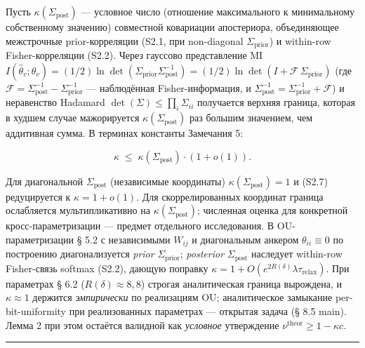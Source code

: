 \documentclass[pdflatex,sn-mathphys-ay]{sn-jnl}
\begin{document}
Пусть \(\kappa(\Sigma_{\text{post}})\) --- условное число (отношение максимального к минимальному собственному значению) совместной ковариации апостериора, объединяющее межстрочные prior-корреляции (S2.1, при non-diagonal \(\Sigma_{\text{prior}}\)) и within-row Fisher-корреляции (S2.2). Через гауссово представление MI \(I(\hat\theta_v; \theta_v) = (1/2) \ln \det(\Sigma_{\text{prior}} \Sigma_{\text{post}}^{-1}) = (1/2) \ln \det(I + \mathcal{F}\,\Sigma_{\text{prior}})\) (где \(\mathcal{F} = \Sigma_{\text{post}}^{-1} - \Sigma_{\text{prior}}^{-1}\) --- наблюдённая Fisher-информация, и \(\Sigma_{\text{post}}^{-1} = \Sigma_{\text{prior}}^{-1} + \mathcal{F}\)) и неравенство Hadamard \(\det(\Sigma) \le \prod_i \Sigma_{ii}\) получается верхняя граница, которая в худшем случае мажорируется \(\kappa(\Sigma_{\text{post}})\) раз большим значением, чем аддитивная сумма. В терминах константы Замечания 5:



\begin{equation}\kappa \;\le\; \kappa(\Sigma_{\text{post}}) \cdot (1 + o(1)). \tag{S2.7}\end{equation}



Для диагональной \(\Sigma_{\text{post}}\) (независимые координаты) \(\kappa(\Sigma_{\text{post}}) = 1\) и (S2.7) редуцируется к \(\kappa = 1 + o(1)\). Для скоррелированных координат граница ослабляется мультипликативно на \(\kappa(\Sigma_{\text{post}})\); численная оценка для конкретной кросс-параметризации --- предмет отдельного исследования. В OU-параметризации § 5.2 с независимыми \(W_{ij}\) и диагональным анкером \(\theta_{ii} \equiv 0\) по построению диагонализуется \emph{prior} \(\Sigma_{\text{prior}}\); \emph{posterior} \(\Sigma_{\text{post}}\) наследует within-row Fisher-связь softmax (S2.2), дающую поправку \(\kappa = 1 + O(e^{2R(\delta)}\lambda\tau_{\text{relax}})\). При параметрах § 6.2 (\(R(\delta) \approx 8{,}8\)) строгая аналитическая граница вырождена, и \(\kappa \approx 1\) держится \emph{эмпирически} по реализациям OU; аналитическое замыкание per-bit-uniformity при реализованных параметрах --- открытая задача (§ 8.5 main). Лемма 2 при этом остаётся валидной как \emph{условное} утверждение \(\nu^{\text{theor}} \ge 1 - \kappa c\).



\begin{center}\rule{0.5\linewidth}{0.5pt}\end{center}
\end{document}
